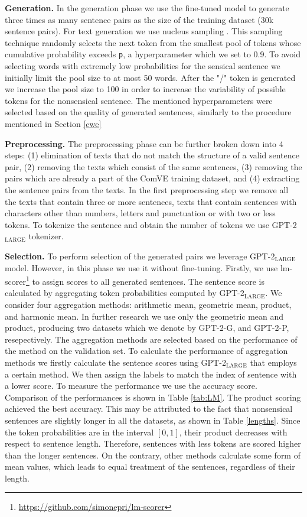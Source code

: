 \documentclass[10pt, a4paper]{article}
\begin{document}
\textbf{Generation.} In the generation phase we use the fine-tuned model to generate three times as many sentence pairs as the size of the training dataset (30k sentence pairs). For text generation we use nucleus sampling \citep{nucleus}. This sampling technique randomly selects the next token from the smallest pool of tokens whose cumulative probability exceeds \texttt{p}, a hyperparameter which we set to 0.9. To avoid selecting words with extremely low probabilities for the sensical sentence we initially limit the pool size to at most 50 words. After the "/" token is generated we increase the pool size to 100 in order to increase the variability of possible tokens for the nonsensical sentence. The mentioned hyperparameters were selected based on the quality of generated sentences, similarly to the procedure mentioned in Section \ref{cwe}

\textbf{Preprocessing.} The preprocessing phase can be further broken down into 4 steps: (1) elimination of texts that do not match the structure of a valid sentence pair, (2) removing the texts which consist of the same sentences, (3) removing the pairs which are already a part of the ComVE training dataset, and (4) extracting the sentence pairs from the texts. In the first preprocessing step we remove all the texts that contain three or more sentences, texts that contain sentences with characters other than numbers, letters and punctuation or with two or less tokens. To tokenize the sentence and obtain the number of tokens we use GPT-2$_\text{LARGE}$ tokenizer. 

\textbf{Selection.} To perform selection of the generated pairs we leverage GPT-2$_\text{LARGE}$ model. However, in this phase we use it without fine-tuning. Firstly, we use lm-scorer\footnote{\href{https://github.com/simonepri/lm-scorer}{https://github.com/simonepri/lm-scorer}} to assign scores to all generated sentences. The sentence score is calculated by aggregating token probabilities computed by GPT-2$_\text{LARGE}$. We consider four aggregation methods: arithmetic mean, geometric mean, product, and harmonic mean. In further research we use only the geometric mean and product, producing two datasets which we denote by GPT-2-G, and GPT-2-P, resepectively. The aggregation methods are selected based on the performance of the method on the validation set. To calculate the performance of aggregation methods we firstly calculate the sentence scores using GPT-2$_\text{LARGE}$ that employs a certain method. We then assign the labels to match the index of sentence with a lower score. To measure the performance we use the accuracy score. Comparison of the performances is shown in Table \ref{tab:LM}. The product scoring achieved the best accuracy. This may be attributed to the fact that nonsensical sentences are slightly longer in all the datasets, as shown in Table \ref{lengths}. Since the token probabilities are in the interval $[0, 1]$, their product decreases with respect to sentence length. Therefore, sentences with less tokens are scored higher than the longer sentences. On the contrary, other methods calculate some form of mean values, which leads to equal treatment of the sentences, regardless of their length.
\end{document}
